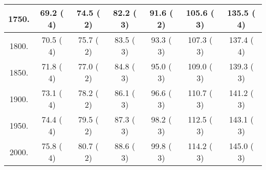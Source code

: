 \begin{tabular}{|c||c|c|c|c|c|c|}
\hline
 1750. &    69.2 (      4) &    74.5 (      2) &    82.2 (      3) &    91.6 (      2) &   105.6 (      3) &   135.5 (      4)\tabularnewline
\hline
 1800. &    70.5 (      4) &    75.7 (      2) &    83.5 (      3) &    93.3 (      3) &   107.3 (      3) &   137.4 (      4)\tabularnewline
\hline
 1850. &    71.8 (      4) &    77.0 (      2) &    84.8 (      3) &    95.0 (      3) &   109.0 (      3) &   139.3 (      3)\tabularnewline
\hline
 1900. &    73.1 (      4) &    78.2 (      2) &    86.1 (      3) &    96.6 (      3) &   110.7 (      3) &   141.2 (      3)\tabularnewline
\hline
 1950. &    74.4 (      4) &    79.5 (      2) &    87.3 (      3) &    98.2 (      3) &   112.5 (      3) &   143.1 (      3)\tabularnewline
\hline
 2000. &    75.8 (      4) &    80.7 (      2) &    88.6 (      3) &    99.8 (      3) &   114.2 (      3) &   145.0 (      3)\tabularnewline
\hline
\end{tabular}
